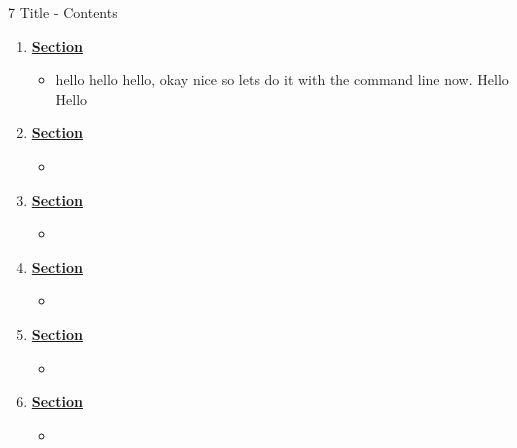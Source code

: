 \documentclass[12pt,letterpaper]{article}
\begin{document}
\setcounter{section}{7} %
\begin{chapbox}{7 Title - Contents}{ 
\begin{enumerate}[font=\bfseries, wide]
\item \hyperlink{7.1}{\textbf{Section}}
    \begin{itemize}
        \item hello hello hello, okay nice so lets do it with the command line now. Hello Hello
    \end{itemize}
    \item \hyperlink{7.2}{\textbf{Section}}
    \begin{itemize}
        \item 
    \end{itemize}
\item \hyperlink{7.3}{\textbf{Section}}
    \begin{itemize}
        \item 
    \end{itemize}
\item \hyperlink{7.4}{\textbf{Section}}
    \begin{itemize}
        \item 
    \end{itemize}
\item \hyperlink{7.5}{\textbf{Section}}
    \begin{itemize}
        \item 
    \end{itemize}
\item \hyperlink{7.6}{\textbf{Section}}
    \begin{itemize}
        \item 
    \end{itemize}
\end{enumerate}
}\end{chapbox}
\end{document}
